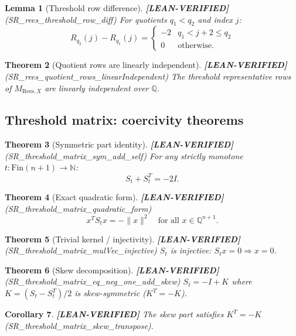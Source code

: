 \documentclass[11pt]{article}
\newtheorem{theorem}{Theorem}[section]
\newtheorem{lemma}[theorem]{Lemma}
\newtheorem{corollary}[theorem]{Corollary}
\theoremstyle{remark}
\newcommand{\LEANVERIFIED}{\textbf{\color{green!60!black}[LEAN-VERIFIED]}}
\begin{document}
\begin{lemma}[Threshold row difference] \LEANVERIFIED{} \textnormal{(SR\_rees\_threshold\_row\_diff)}
For quotients $q_1 < q_2$ and index $j$:
\[
R_{q_2}(j) - R_{q_1}(j) = \begin{cases} -2 & q_1 < j+2 \leq q_2 \\ 0 & \text{otherwise.} \end{cases}
\]
\end{lemma}

\begin{theorem}[Quotient rows are linearly independent] \LEANVERIFIED{} \textnormal{(SR\_rees\_quotient\_rows\_linearIndependent)}
The threshold representative rows of $M_{\mathrm{Rees},X}$ are linearly independent over $\mathbb{Q}$.
\end{theorem}

\subsection{Threshold matrix: coercivity theorems}

\begin{theorem}[Symmetric part identity] \LEANVERIFIED{} \textnormal{(SR\_threshold\_matrix\_sym\_add\_self)}
For any strictly monotone $t : \mathrm{Fin}(n+1) \to \mathbb{N}$:
\[
S_t + S_t^T = -2I.
\]
\end{theorem}

\begin{theorem}[Exact quadratic form] \LEANVERIFIED{} \textnormal{(SR\_threshold\_matrix\_quadratic\_form)}
\[
x^T S_t x = -\|x\|^2 \quad \text{for all } x \in \mathbb{Q}^{n+1}.
\]
\end{theorem}

\begin{theorem}[Trivial kernel / injectivity] \LEANVERIFIED{} \textnormal{(SR\_threshold\_matrix\_mulVec\_injective)}
$S_t$ is injective: $S_t x = 0 \Rightarrow x = 0$.
\end{theorem}

\begin{theorem}[Skew decomposition] \LEANVERIFIED{} \textnormal{(SR\_threshold\_matrix\_eq\_neg\_one\_add\_skew)}
$S_t = -I + K$ where $K = (S_t - S_t^T)/2$ is skew-symmetric ($K^T = -K$).
\end{theorem}

\begin{corollary} \LEANVERIFIED{}
The skew part satisfies $K^T = -K$ (SR\_threshold\_matrix\_skew\_transpose).
\end{corollary}
\end{document}
